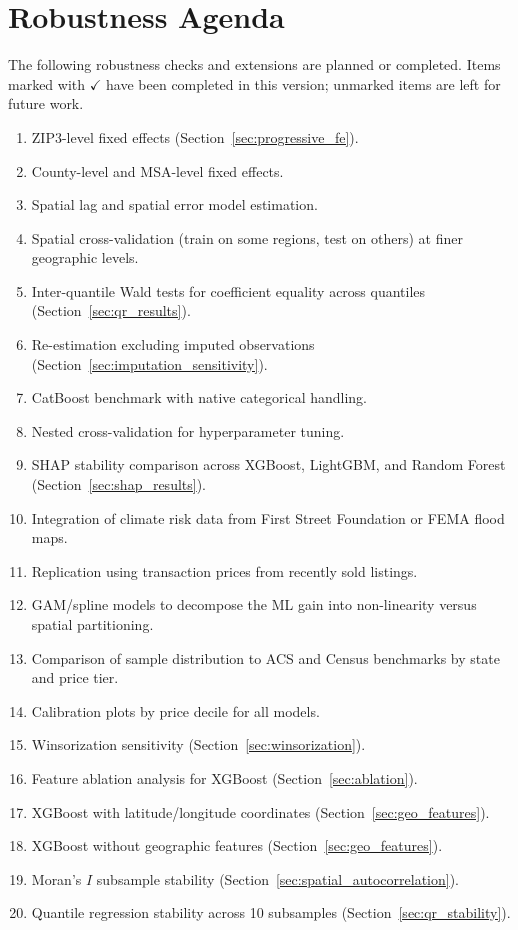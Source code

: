 \section{Robustness Agenda}
\label{app:robustness_agenda}

The following robustness checks and extensions are planned or completed. Items marked with $\checkmark$ have been completed in this version; unmarked items are left for future work.

\begin{enumerate}[nosep]
    \item[$\checkmark$] ZIP3-level fixed effects (Section~\ref{sec:progressive_fe}).
    \item County-level and MSA-level fixed effects.
    \item Spatial lag and spatial error model estimation.
    \item Spatial cross-validation (train on some regions, test on others) at finer geographic levels.
    \item[$\checkmark$] Inter-quantile Wald tests for coefficient equality across quantiles (Section~\ref{sec:qr_results}).
    \item[$\checkmark$] Re-estimation excluding imputed observations (Section~\ref{sec:imputation_sensitivity}).
    \item CatBoost benchmark with native categorical handling.
    \item Nested cross-validation for hyperparameter tuning.
    \item[$\checkmark$] SHAP stability comparison across XGBoost, LightGBM, and Random Forest (Section~\ref{sec:shap_results}).
    \item Integration of climate risk data from First Street Foundation or FEMA flood maps.
    \item Replication using transaction prices from recently sold listings.
    \item GAM/spline models to decompose the ML gain into non-linearity versus spatial partitioning.
    \item Comparison of sample distribution to ACS and Census benchmarks by state and price tier.
    \item Calibration plots by price decile for all models.
    \item[$\checkmark$] Winsorization sensitivity (Section~\ref{sec:winsorization}).
    \item[$\checkmark$] Feature ablation analysis for XGBoost (Section~\ref{sec:ablation}).
    \item[$\checkmark$] XGBoost with latitude/longitude coordinates (Section~\ref{sec:geo_features}).
    \item[$\checkmark$] XGBoost without geographic features (Section~\ref{sec:geo_features}).
    \item[$\checkmark$] Moran's $I$ subsample stability (Section~\ref{sec:spatial_autocorrelation}).
    \item[$\checkmark$] Quantile regression stability across 10 subsamples (Section~\ref{sec:qr_stability}).
\end{enumerate}


